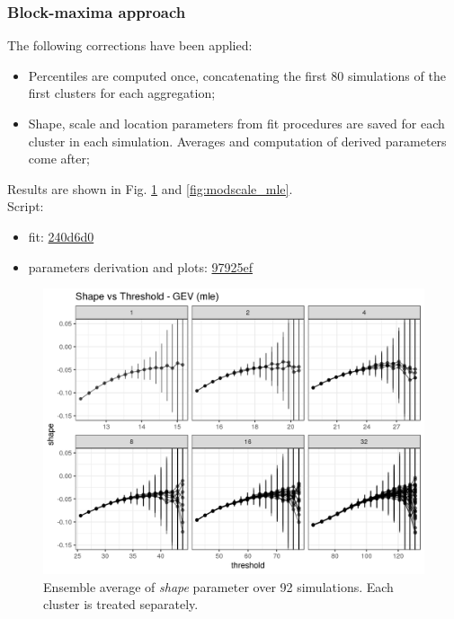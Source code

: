 \documentclass{article}
\begin{document}
\subsubsection{Block-maxima approach}

The following corrections have been applied:

\begin{itemize}
	\item Percentiles are computed once, concatenating the first 80 simulations of the first clusters for each aggregation;
	\item Shape, scale and location parameters from fit procedures are saved for each cluster in each simulation. Averages and computation of derived parameters come after;	
\end{itemize}
Results are shown in Fig. \ref{fig:shape_mle} and \ref{fig:modscale_mle}.
\\Script:
\begin{itemize}
	\item fit: \href{https://github.com/marco-cucchi/L96gev/commit/240d6d0471ddc3fc53789e43e03a87013d032b86#diff-9576f7ab149830e9a08339b0fc9f2569}{240d6d0}
	\item parameters derivation and plots: \href{https://github.com/marco-cucchi/L96gev/commit/97925ef80db61ade1851bb7c41948d7f13f3b91f#diff-9ecb506d1ae86460add99c76d6c9961a}{97925ef}
\end{itemize}


\begin{figure}
	\includegraphics[width=\linewidth]{fig/shape_gev_mle_RK401_1e7_maxt05_1e7.png}
	\caption{Ensemble average of \textit{shape} parameter over 92 simulations. Each cluster is treated separately.}
	\label{fig:shape_mle}
\end{figure}
\end{document}

